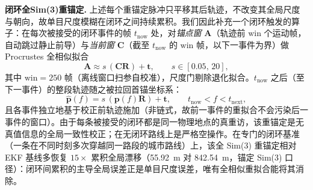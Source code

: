 \textbf{闭环全Sim(3)重锚定.} 上述每个重锚定脉冲只平移其后轨迹，不改变其全局尺度与朝向，故单目尺度模糊在闭环之间持续累积。我们因此补充一个闭环触发的算子：在每次被接受的闭环事件的帧 $t_{\mathrm{now}}$ 处，对\emph{锚点窗} $\mathbf{A}$（轨迹前 $\mathrm{win}$ 个运动帧，自动跳过静止前导）与\emph{当前窗} $\mathbf{C}$（截至 $t_{\mathrm{now}}$ 的 $\mathrm{win}$ 帧，以下一事件为界）做 Procrustes 全相似拟合
\begin{equation}
    \mathbf{A} \approx s\,(\mathbf{C}\mathbf{R}) + \mathbf{t}, \qquad s \in [0.05,\,20],
\end{equation}
其中 $\mathrm{win} = 250$ 帧（离线窗口扫参自校准），尺度门剔除退化拟合。$t_{\mathrm{now}}$ 之后（至下一事件）的整段轨迹随之被拉回首锚坐标系：
\begin{equation}
    \hat{\mathbf{p}}(f) = s\,(\mathbf{p}(f)\mathbf{R}) + \mathbf{t}, \qquad t_{\mathrm{now}} < f < t_{\mathrm{next}},
\end{equation}
且各事件独立地基于校正前轨迹施加（非链式，故前一事件的重拟合不会污染后一事件的窗口）。由于每条被接受的闭环都是同一物理地点的真重访，该重锚定是无真值信息的全局一致性校正；在无闭环路线上是严格空操作。在专门的闭环基准（一条在不同时刻多次穿越同一路段的城市路线）上，该全 Sim(3) 重锚定相对 EKF 基线多恢复 $15\times$ 累积全局漂移（55.92~m 对 842.54~m，锚定 Sim(3) 口径）：闭环间累积的主导全局误差正是单目尺度误差，唯有全相似重拟合能将其消除。
